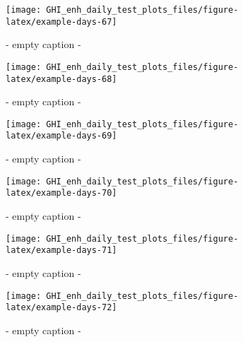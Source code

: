 \documentclass[
  10pt,
  a4paper,oneside]{article}
\begin{document}
\begin{figure}[H]

{\centering \texttt{[image: GHI\_enh\_daily\_test\_plots\_files/figure-latex/example-days-67]} 

}

\caption{ - empty caption - }\label{fig:example-days-67}
\end{figure}

\begin{figure}[H]

{\centering \texttt{[image: GHI\_enh\_daily\_test\_plots\_files/figure-latex/example-days-68]} 

}

\caption{ - empty caption - }\label{fig:example-days-68}
\end{figure}

\begin{figure}[H]

{\centering \texttt{[image: GHI\_enh\_daily\_test\_plots\_files/figure-latex/example-days-69]} 

}

\caption{ - empty caption - }\label{fig:example-days-69}
\end{figure}

\begin{figure}[H]

{\centering \texttt{[image: GHI\_enh\_daily\_test\_plots\_files/figure-latex/example-days-70]} 

}

\caption{ - empty caption - }\label{fig:example-days-70}
\end{figure}

\begin{figure}[H]

{\centering \texttt{[image: GHI\_enh\_daily\_test\_plots\_files/figure-latex/example-days-71]} 

}

\caption{ - empty caption - }\label{fig:example-days-71}
\end{figure}

\begin{figure}[H]

{\centering \texttt{[image: GHI\_enh\_daily\_test\_plots\_files/figure-latex/example-days-72]} 

}

\caption{ - empty caption - }\label{fig:example-days-72}
\end{figure}
\end{document}
